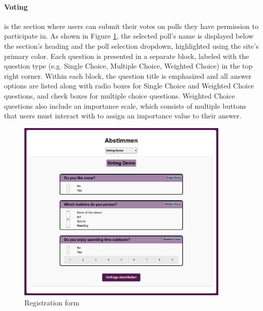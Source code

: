 \documentclass[a4paper,12pt]{report}
\begin{document}
\paragraph{Voting} is the section where users can submit their votes on polls they have permission to participate in. As shown in Figure \ref{fig:voting_view}, the selected poll's name is displayed below the section's heading and the poll selection dropdown, highlighted using the site's primary color. Each question is presented in a separate block, labeled with the question type (e.g. Single Choice, Multiple Choice, Weighted Choice) in the top right corner. Within each block, the question title is emphasized and all answer options are listed along with radio boxes for Single Choice and Weighted Choice questions, and check boxes for multiple choice questions. Weighted Choice questions also include an importance scale, which consists of multiple buttons that users must interact with to assign an importance value to their answer.
\begin{figure}[H]
	\centering
	\includegraphics[width=0.9\textwidth]{pics/voting_view.png}
	\caption{Registration form}
	\label{fig:voting_view}
\end{figure}
\end{document}
